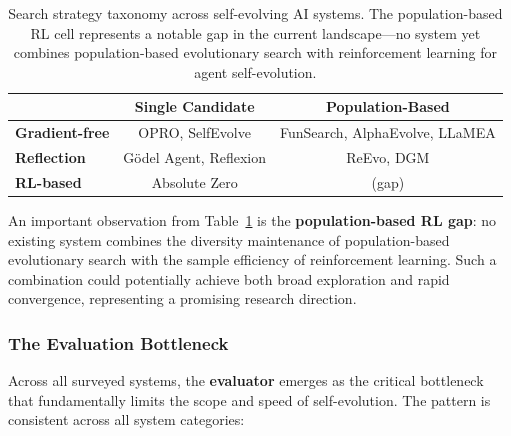 \begin{table}[htbp]
\centering
\begin{tabular}{lcc}
\toprule
& \textbf{Single Candidate} & \textbf{Population-Based} \\
\midrule
\textbf{Gradient-free} & OPRO, SelfEvolve & FunSearch, AlphaEvolve, LLaMEA \\
\textbf{Reflection} & G\"{o}del Agent, Reflexion & ReEvo, DGM \\
\textbf{RL-based} & Absolute Zero & (gap) \\
\bottomrule
\end{tabular}
\caption{Search strategy taxonomy across self-evolving AI systems. The population-based RL cell represents a notable gap in the current landscape---no system yet combines population-based evolutionary search with reinforcement learning for agent self-evolution.}
\label{tab:search-strategy}
\end{table}

An important observation from Table~\ref{tab:search-strategy} is the \textbf{population-based RL gap}: no existing system combines the diversity maintenance of population-based evolutionary search with the sample efficiency of reinforcement learning. Such a combination could potentially achieve both broad exploration and rapid convergence, representing a promising research direction.


\subsubsection{The Evaluation Bottleneck}

Across all surveyed systems, the \textbf{evaluator} emerges as the critical bottleneck that fundamentally limits the scope and speed of self-evolution. The pattern is consistent across all system categories:

